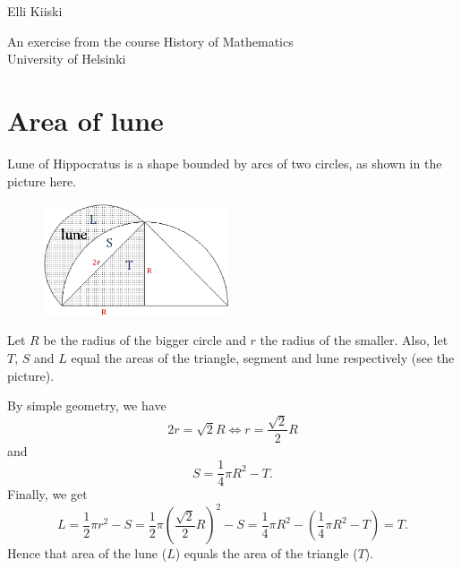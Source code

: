 \documentclass{article}
\begin{document}
{\large
Elli Kiiski
\par
An exercise from the course History of Mathematics\\University of Helsinki
}
\vspace{0.5cm}

\section*{Area of lune}

Lune of Hippocratus is a shape bounded by arcs of two circles, as shown in the picture here.
\begin{figure}[!htb]
    \centering
    \includegraphics[width =55mm]{lune.eps}
\end{figure}

Let $R$ be the radius of the bigger circle and $r$ the radius of the smaller. Also, let $T$, $S$ and $L$ equal the areas of the triangle, segment and lune respectively (see the picture).

By simple geometry, we have
\begin{equation*}
\label{radius}
    2r=\sqrt{2}R \Leftrightarrow r=\frac{\sqrt{2}}{2}R
\end{equation*}
and
\begin{equation*}
\label{segment}
    S = \frac{1}{4}\pi R^2 - T.
\end{equation*}
Finally, we get
\begin{equation*}
    L = \frac{1}{2}\pi r^2 - S = \frac{1}{2}\pi (\frac{\sqrt{2}}{2}R)^2 - S = \frac{1}{4}\pi R^2 - (\frac{1}{4}\pi R^2 - T) = T.
\end{equation*}
Hence that area of the lune ($L$) equals the area of the triangle ($T$).
\end{document}
